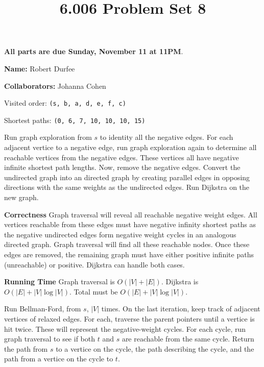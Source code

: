 \documentclass[12pt,twoside]{article}
\title{6.006 Problem Set 8}
\newcommand{\theproblemsetnum}{8}
\newcommand{\releasedate}{Thursday, November 1}
\newcommand{\partaduedate}{Sunday, November 11}
\begin{document}
\handout{Problem Set \theproblemsetnum}{\releasedate}
\textbf{All parts are due {\bf \partaduedate} at {\bf 11PM}}.

\setlength{\parindent}{0pt}
\medskip\hrulefill\medskip

{\bf Name:} Robert Durfee

\medskip

{\bf Collaborators:} Johanna Cohen

\medskip\hrulefill

\begin{problems}

\problem

\begin{problemparts}
\problempart Visited order:
{\tt (s, b, a, d, e, f, c)}

Shortest paths:
{\tt (0, 6, 7, 10, 10, 10, 15)}

 Run graph exploration from $s$ to identity all
the negative edges. For each adjacent vertice to a negative edge, run graph
exploration again to determine all reachable vertices from the negative
edges. These vertices all have negative infinite shortest path lengths. Now,
remove the negative edges. Convert the undirected graph into an directed
graph by creating parallel edges in opposing directions with the same weights
as the undirected edges. Run Dijkstra on the new graph.

{\bf Correctness} Graph traversal will reveal all reachable negative weight
edges. All vertices reachable from these edges must have negative infinity
shortest paths as the negative undirected edges form negative weight cycles
in an analogous directed graph. Graph traversal will find all these reachable
nodes. Once these edges are removed, the remaining graph must have either
positive infinite paths (unreachable) or positive. Dijkstra can handle both
cases.

{\bf Running Time} Graph traversal is $O(|V| + |E|)$. Dijkstra is $O(|E| +
|V| \log |V|)$. Total must be $O(|E| + |V| \log |V|)$.

 Run Bellman-Ford, from $s$, $|V|$ times. On
the last iteration, keep track of adjacent vertices of relaxed edges. For
each, traverse the parent pointers until a vertice is hit twice. These will
represent the negative-weight cycles. For each cycle, run graph traversal to
see if both $t$ and $s$ are reachable from the same cycle. Return the path
from $s$ to a vertice on the cycle, the path describing the cycle, and the
path from a vertice on the cycle to $t$.


\end{problemparts}
\end{problems}
\end{document}
